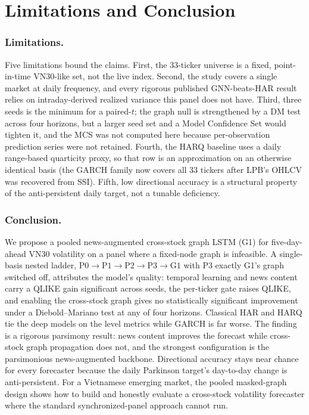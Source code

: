 \documentclass[runningheads]{llncs}
\newcommand{\ntick}{33}
\begin{document}
\section{Limitations and Conclusion}
\label{sec:conclusion}

\subsubsection{Limitations.}
Five limitations bound the claims. First, the \ntick-ticker universe is a fixed, point-in-time VN30-like
set, not the live index. Second, the study covers a single market at daily frequency, and every rigorous
published GNN-beats-HAR result relies on intraday-derived realized variance this panel does not have.
Third, three seeds is the minimum for a paired-$t$; the graph null is strengthened by a DM test across four
horizons, but a larger seed set and a Model Confidence Set would tighten it, and the MCS was not computed
here because per-observation prediction series were not retained. Fourth, the HARQ baseline uses a daily
range-based quarticity proxy, so that row is an approximation on an otherwise identical basis (the GARCH
family now covers all \ntick{} tickers after LPB's OHLCV was recovered from SSI). Fifth, low directional
accuracy is a structural property of the
anti-persistent daily target, not a tunable deficiency.

\subsubsection{Conclusion.}
We propose a pooled news-augmented cross-stock graph LSTM (G1) for five-day-ahead VN30 volatility on a
panel where a fixed-node graph is infeasible. A single-basis nested ladder, $\text{P0}\to\text{P1}\to
\text{P2}\to\text{P3}\to\text{G1}$ with P3 exactly G1's graph switched off, attributes the model's quality:
temporal learning and news content carry a QLIKE gain significant across seeds, the per-ticker gate raises
QLIKE, and enabling the cross-stock graph gives no statistically significant improvement under a
Diebold--Mariano test at any of four horizons. Classical HAR and HARQ tie the deep models on the level
metrics while GARCH is far worse. The finding is a rigorous parsimony result: news content improves the
forecast while cross-stock graph propagation does not, and the strongest configuration is the parsimonious
news-augmented backbone. Directional accuracy stays near chance for every forecaster because the daily
Parkinson target's day-to-day change is anti-persistent. For a Vietnamese emerging market, the pooled
masked-graph design shows how to build and honestly evaluate a cross-stock volatility forecaster where the
standard synchronized-panel approach cannot run.
\end{document}
